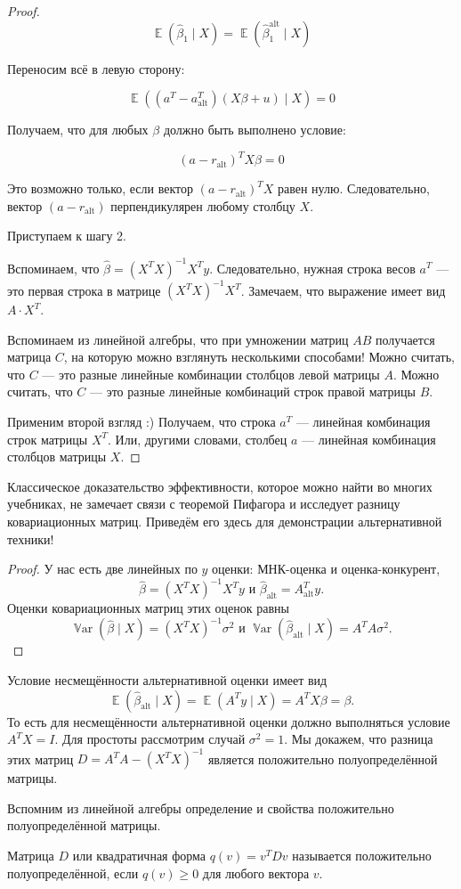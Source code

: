 \documentclass[12pt]{article}
\DeclareMathOperator{\Var}{\mathbb{V}ar}
\DeclareMathOperator{\E}{\mathbb{E}}
\newcommand{\hb}{\hat{\beta}}
\newcommand{\alt}{\text{alt}}
\begin{document}
\begin{proof}
\[
\E(\hb_1 \mid X) = \E(\hb_1^{\alt} \mid X)
\]

Переносим всё в левую сторону:

\[
\E((a^T - a^T_{\alt})(X\beta + u) \mid X) = 0
\]

Получаем, что для любых $\beta$ должно быть выполнено условие:

\[
(a - r_{\alt})^T X\beta = 0
\]

Это возможно только, если вектор $(a - r_{\alt})^T X$ равен нулю. 
Следовательно, вектор $(a - r_{\alt})$ перпендикулярен любому столбцу $X$.


Приступаем к шагу 2.

Вспоминаем, что $\hat \beta = (X^T X)^{-1}X^T y$. Следовательно, нужная строка весов $a^T$ — 
это первая строка в матрице $(X^TX)^{-1}X^T$. 
Замечаем, что выражение имеет вид $A \cdot X^T$. 

Вспоминаем из линейной алгебры, что при умножении матриц $AB$ получается матрица $C$, 
на которую можно взглянуть несколькими способами!
Можно считать, что $C$ — это разные линейные комбинации столбцов левой матрицы $A$. 
Можно считать, что $C$ — это разные линейные комбинаций строк правой матрицы $B$.

Применим второй взгляд :) Получаем, что строка $a^T$ — линейная комбинация строк матрицы $X^T$. 
Или, другими словами, столбец $a$ — линейная комбинация столбцов матрицы $X$.
\end{proof}

Классическое доказательство эффективности, которое можно найти во многих учебниках, не замечает связи с теоремой Пифагора и исследует разницу ковариационных матриц. 
Приведём его здесь для демонстрации альтернативной техники!
\begin{proof}
У нас есть две линейных по $y$ оценки: МНК-оценка и оценка-конкурент,
\[
\hb = (X^TX)^{-1}X^T y \text{ и } \hb_{\alt} = A^T_{\alt} y.
\]
Оценки ковариационных матриц этих оценок равны 
\[
\Var(\hb \mid X) = (X^TX)^{-1} \sigma^2 \text{ и } \Var(\hb_{\alt} \mid X) = A^TA \sigma^2.
\]
\end{proof}
Условие несмещённости альтернативной оценки имеет вид 
\[
\E(\hb_{\alt} \mid X) = \E(A^T y \mid X) = A^T X\beta = \beta.
\]
То есть для несмещённости альтернативной оценки должно выполняться условие $A^T X = I$.
Для простоты рассмотрим случай $\sigma^2 = 1$.
Мы докажем, что разница этих матриц $D = A^TA - (X^TX)^{-1}$ является положительно полуопределённой матрицы. 

Вспомним из линейной алгебры определение и свойства положительно полуопределённой матрицы.
\begin{definition}
Матрица $D$ или квадратичная форма $q(v) = v^T D v$ называется положительно полуопределённой, если $q(v) \geq 0$ для любого вектора $v$.
\end{definition}
\end{document}
